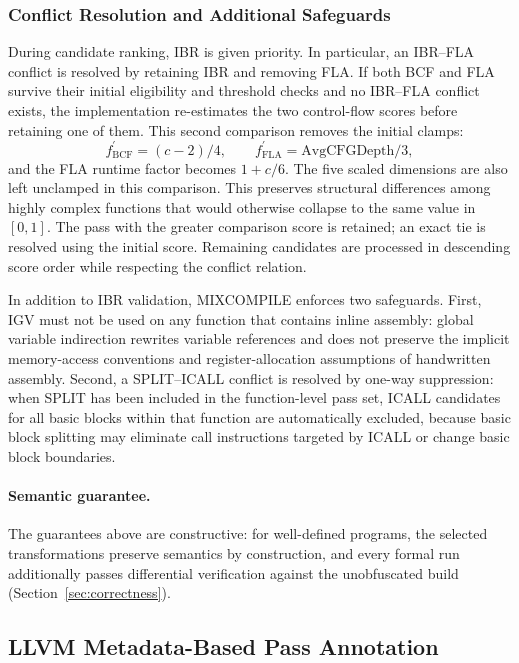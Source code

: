 \documentclass[5p,times,authoryear]{elsarticle}
\theoremstyle{plain}
\theoremstyle{definition}
\theoremstyle{remark}
\begin{document}
\subsubsection{Conflict Resolution and Additional Safeguards}

During candidate ranking, IBR is given priority. In particular, an IBR--FLA conflict
is resolved by retaining IBR and removing FLA.  If both BCF and FLA survive their
initial eligibility and threshold checks and no IBR--FLA conflict exists, the
implementation re-estimates the two control-flow scores before retaining one of them.
This second comparison removes the initial clamps:
\begin{equation}
f^{\prime}_{\mathrm{BCF}}=(c-2)/4,\qquad
f^{\prime}_{\mathrm{FLA}}=\mathrm{AvgCFGDepth}/3,
\end{equation}
and the FLA runtime factor becomes $1+c/6$.  The five scaled dimensions are also left
unclamped in this comparison.  This preserves structural differences among highly
complex functions that would otherwise collapse to the same value in $[0,1]$.  The
pass with the greater comparison score is retained; an exact tie is resolved using the
initial score.  Remaining candidates are processed in descending score order while
respecting the conflict relation.

In addition to IBR validation, MIXCOMPILE enforces two safeguards. First, IGV must
not be used on any function that contains inline assembly: global variable indirection
rewrites variable references and does not preserve the implicit memory-access
conventions and register-allocation assumptions of handwritten assembly. Second, a
SPLIT--ICALL conflict is resolved by one-way suppression: when SPLIT has been included
in the function-level pass set, ICALL candidates for all basic blocks within that
function are automatically excluded, because basic block splitting may eliminate call
instructions targeted by ICALL or change basic block boundaries.

\paragraph{Semantic guarantee.}
The guarantees above are constructive: for well-defined programs, the selected
transformations preserve semantics by construction, and every formal run
additionally passes differential verification against the unobfuscated build
(Section~\ref{sec:correctness}).

\subsection{LLVM Metadata-Based Pass Annotation}
\end{document}
